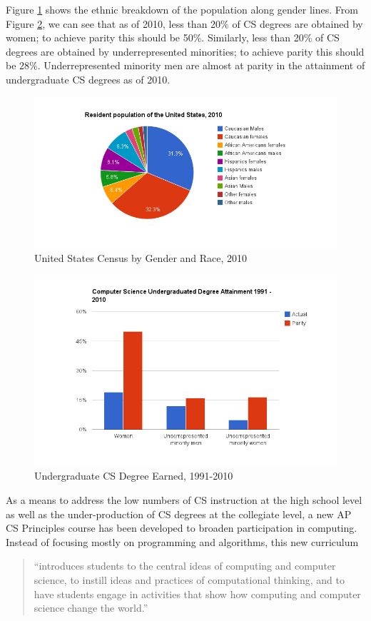 \documentclass[oneside,titlepage,numbers=noenddot,headinclude,%
               footinclude=true,cleardoublepage=empty,abstractoff,BCOR=2mm,%
               paper=a4,fontsize=11pt,ngerman,american]{scrreprt}
\numberwithin{theorem}{chapter}
\numberwithin{definition}{chapter}
\numberwithin{algorithm}{chapter}
\numberwithin{figure}{chapter}
\numberwithin{table}{chapter}
\numberwithin{equation}{chapter}
\begin{document}
Figure \ref{popuGenderRace} shows the ethnic breakdown of the population along gender lines. From Figure \ref{popuCSUndergrad}, we can see that as of 2010, less than 20\% of CS degrees are obtained by women; to achieve parity this should be 50\%. Similarly, less than 20\% of CS degrees are obtained by underrepresented minorities; to achieve parity this should be 28\%. Underrepresented minority men are almost at parity in the attainment of undergraduate CS degrees as of 2010. 

\begin{figure}[hbtp]
  \centering
  \includegraphics[width=1\textwidth]{chart_3}
  \caption{United States Census by Gender and Race, 2010}
  \label{popuGenderRace}
\end{figure}

\begin{figure}[hbtp]
  \centering
  \includegraphics[width=1\textwidth]{chart_1}
   \caption{Undergraduate CS Degree Earned, 1991-2010}
  \label{popuCSUndergrad}
\end{figure}

As a means to address the low numbers of CS instruction at the high school level as well as the under-production of CS degrees at the collegiate level, a new AP CS Principles course has been developed to broaden participation in computing. Instead of focusing mostly on programming and algorithms, this new curriculum 
\begin{quote}
``introduces students to the central ideas of computing and computer science, to instill ideas and practices of computational thinking, and to have students engage in activities that show how computing and computer science change the world.'' \cite{Board:zr}
\end{quote}
\end{document}
